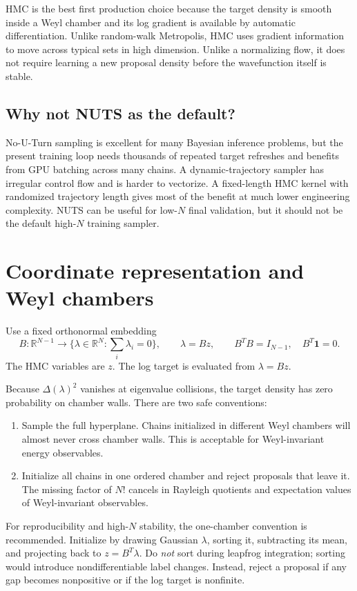 \documentclass[11pt]{article}
\newcommand{\R}{\mathbb{R}}
\newcommand{\D}{\Delta}
\begin{document}
HMC is the best first production choice because the target density is smooth inside a Weyl chamber and its log gradient is available by automatic differentiation.  Unlike random-walk Metropolis, HMC uses gradient information to move across typical sets in high dimension.  Unlike a normalizing flow, it does not require learning a new proposal density before the wavefunction itself is stable.

\subsection{Why not NUTS as the default?}

No-U-Turn sampling is excellent for many Bayesian inference problems, but the present training loop needs thousands of repeated target refreshes and benefits from GPU batching across many chains.  A dynamic-trajectory sampler has irregular control flow and is harder to vectorize.  A fixed-length HMC kernel with randomized trajectory length gives most of the benefit at much lower engineering complexity.  NUTS can be useful for low-$N$ final validation, but it should not be the default high-$N$ training sampler.

\section{Coordinate representation and Weyl chambers}

Use a fixed orthonormal embedding
\begin{equation}
 B:\R^{N-1}\to\{\lambda\in\R^N:\sum_i\lambda_i=0\},
 \qquad
 \lambda=Bz,
 \qquad B^TB=I_{N-1},\quad B^T\mathbf 1=0.
\end{equation}
The HMC variables are $z$.  The log target is evaluated from $\lambda=Bz$.

Because $\D(\lambda)^2$ vanishes at eigenvalue collisions, the target density has zero probability on chamber walls.  There are two safe conventions:
\begin{enumerate}[label=(\alph*)]
\item Sample the full hyperplane.  Chains initialized in different Weyl chambers will almost never cross chamber walls.  This is acceptable for Weyl-invariant energy observables.
\item Initialize all chains in one ordered chamber and reject proposals that leave it.  The missing factor of $N!$ cancels in Rayleigh quotients and expectation values of Weyl-invariant observables.
\end{enumerate}
For reproducibility and high-$N$ stability, the one-chamber convention is recommended.  Initialize by drawing Gaussian $\lambda$, sorting it, subtracting its mean, and projecting back to $z=B^T\lambda$.  Do \emph{not} sort during leapfrog integration; sorting would introduce nondifferentiable label changes.  Instead, reject a proposal if any gap becomes nonpositive or if the log target is nonfinite.
\end{document}
